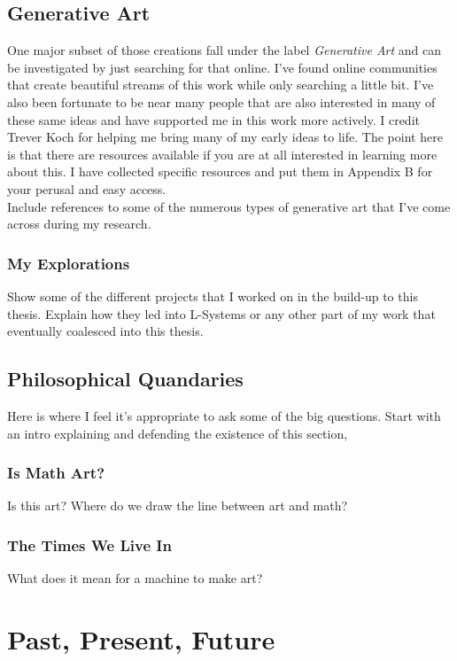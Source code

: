 \documentclass[12pt,twoside]{reedthesis}
\begin{document}
\section{Generative Art}
One major subset of those creations fall under the label \textit{Generative Art} and can be investigated by just searching for that online. I've found online communities that create beautiful streams of this work while only searching a little bit. I've also been fortunate to be near many people that are also interested in many of these same ideas and have supported me in this work more actively. I credit Trever Koch for helping me bring many of my early ideas to life. The point here is that there are resources available if you are at all interested in learning more about this. I have collected specific resources and put them in Appendix B for your perusal and easy access.\\
Include references to some of the numerous types of generative art that I've come across during my research. 
\subsection{My Explorations}
Show some of the different projects that I worked on in the build-up to this thesis. Explain how they led into L-Systems or any other part of my work that eventually coalesced into this thesis.\\

\section{Philosophical Quandaries}
Here is where I feel it's appropriate to ask some of the big questions. Start with an intro explaining and defending the existence of this section,\\
\subsection{Is Math Art?}
Is this art? Where do we draw the line between art and math?\\
\subsection{The Times We Live In}
What does it mean for a machine to make art?\\



\chapter{Past, Present, Future}
\end{document}
